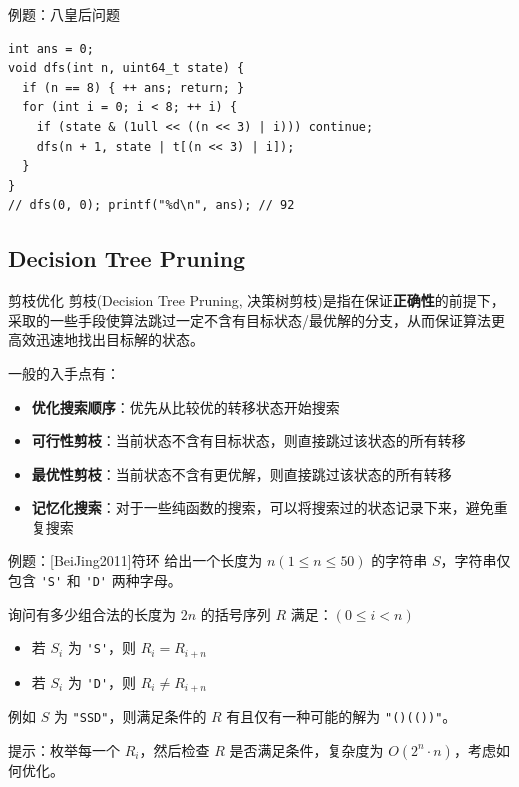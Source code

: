 \documentclass[12pt,aspectratio=169]{beamer}
\begin{document}
\begin{frame}[fragile]{例题：八皇后问题}
  \begin{verbatim}
int ans = 0;
void dfs(int n, uint64_t state) {
  if (n == 8) { ++ ans; return; }
  for (int i = 0; i < 8; ++ i) {
    if (state & (1ull << ((n << 3) | i))) continue;
    dfs(n + 1, state | t[(n << 3) | i]);
  }
}
// dfs(0, 0); printf("%d\n", ans); // 92
  \end{verbatim}
\end{frame}

\subsection[剪枝优化]{Decision Tree Pruning}

\begin{frame}[fragile]{剪枝优化}
  剪枝(Decision Tree Pruning, 决策树剪枝)是指在保证\textbf{正确性}的前提下，采取的一些手段使算法跳过一定不含有目标状态/最优解的分支，从而保证算法更高效迅速地找出目标解的状态。\pause

  一般的入手点有：

  \begin{itemize}
    \item \textbf{优化搜索顺序}：优先从比较优的转移状态开始搜索
    \item \textbf{可行性剪枝}：当前状态不含有目标状态，则直接跳过该状态的所有转移
    \item \textbf{最优性剪枝}：当前状态不含有更优解，则直接跳过该状态的所有转移
    \item \textbf{记忆化搜索}：对于一些纯函数的搜索，可以将搜索过的状态记录下来，避免重复搜索
  \end{itemize}
\end{frame}

\begin{frame}[fragile]{例题：[BeiJing2011]符环}
  给出一个长度为 $n(1 \le n \le 50)$ 的字符串 $S$，字符串仅包含 \verb|'S'| 和 \verb|'D'| 两种字母。

  询问有多少组合法的长度为 $2n$ 的括号序列 $R$ 满足：$(0 \le i < n)$

  \begin{itemize}
    \item 若 $S_i$ 为 \verb|'S'|，则 $R_i = R_{i+n}$
    \item 若 $S_i$ 为 \verb|'D'|，则 $R_i \ne R_{i+n}$
  \end{itemize}

  例如 $S$ 为 \verb|"SSD"|，则满足条件的 $R$ 有且仅有一种可能的解为 \verb|"()(())"|。\pause

  提示：枚举每一个 $R_i$，然后检查 $R$ 是否满足条件，复杂度为 $O(2^n \cdot n)$，考虑如何优化。
\end{frame}
\end{document}
